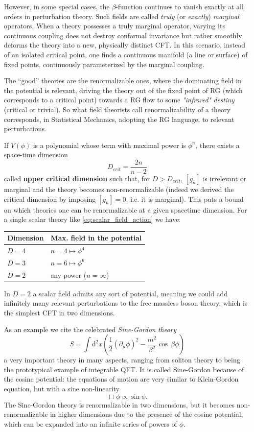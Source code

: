 However, in some special cases, the \(\beta\)-function continues to vanish exactly at all orders in perturbation theory. Such fields are called \textit{truly} (or \textit{exactly}) \textit{marginal} operators. When a theory possesses a truly marginal operator, varying its continuous coupling does not destroy conformal invariance but rather smoothly deforms the theory into a new, physically distinct CFT. In this scenario, instead of an isolated critical point, one finds a continuous manifold (a line or surface) of fixed points, continuously parameterized by the marginal coupling.

\uline{The ``good'' theories are the renormalizable ones}, where the dominating field in the potential is relevant, driving the theory out of the fixed point of RG (which corresponds to a critical point) towards a RG flow to some \textit{"infrared" destiny} (critical or trivial).
So what field theorists call renormalizability of a theory corresponds, in Statistical Mechanics, adopting the RG language, to relevant perturbations.

If \(V(\phi)\) is a polynomial whose term with maximal power is \(\phi^{n}\), there exists a space-time dimension
\[
    D_{crit}=\frac{2n}{n-2}
\]
called \textbf{upper critical dimension} such that, for \(D>D_{crit}\), \([g_{n}]\) is irrelevant or marginal and the theory becomes non-renormalizable (indeed we derived the critical dimension by imposing \([g_n]=0\), i.e. it is marginal). This puts a bound on which theories one can be renormalizable at a given spacetime dimension.
For a single scalar theory like \eqref{eq:scalar_field_action} we have:
\begin{table}[H]
    \centering
    \begin{tabular}{ll}
        \toprule
        Dimension & Max. field in the potential \\
        \midrule
        \(D=4\)   & \(n=4 \mapsto \phi^{4}\)    \\
        \(D=3\)   & \(n=6 \mapsto \phi^{6}\)    \\
        \(D=2\)   & any power (\(n=\infty\))    \\
        \bottomrule
    \end{tabular}
\end{table}

In \(D=2\) a scalar field admits any sort of potential, meaning we could add infinitely many relevant perturbations to the free massless boson theory, which is the simplest CFT in two dimensions.

As an example we cite the celebrated \textit{Sine-Gordon theory}
\[
    S=\int \mathrm{d}^{2}x\left(\frac{1}{2}(\partial_{\mu}\phi)^{2}-\frac{m^{2}}{\beta^{2}}\cos \, \beta\phi\right)
\]
a very important theory in many aspects, ranging from soliton theory to being the prototypical example of integrable QFT. It is called Sine-Gordon because of the cosine potential: the equations of motion are very similar to Klein-Gordon equation, but with a sine non-linearity
\[
    \Box \phi \propto \sin\phi.
\]
The Sine-Gordon theory is renormalizable in two dimensions, but it becomes non-renormalizable in higher dimensions due to the presence of the cosine potential, which can be expanded into an infinite series of powers of \(\phi\).